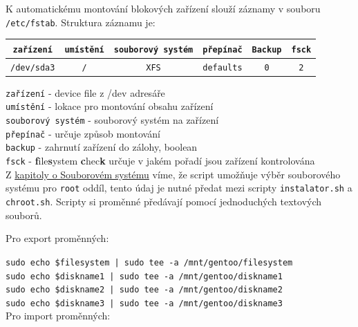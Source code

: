 \documentclass[12pt,a4paper,twoside,]{article}
\begin{document}
{{{{{{K automatickému montování blokových zařízení slouží záznamy v souboru \texttt{/etc/fstab}. Struktura záznamu je:

\begin{table}[h]
	\begin{tabular}{|c|c|c|c|c|c|}
		\hline
		\texttt{zařízení} & \texttt{umístění} & \texttt{souborový systém} & \texttt{přepínač} & \texttt{Backup} & \texttt{fsck} \\
		\hline
		\texttt{/dev/sda3} & \texttt{/} & \texttt{XFS} & \texttt{defaults} & \texttt{0} & \texttt{2} \\
		\hline
		
	\end{tabular}
\end{table}
\hspace*{-1.5em}\texttt{zařízení} - device file z /dev adresáře\\
\texttt{umístění} - lokace pro montování obsahu zařízení \\
\texttt{souborový systém} - souborový systém na zařízení\\
\texttt{přepínač} - určuje způsob montování\\
\texttt{backup} - zahrnutí zařízení do zálohy, boolean\\
\texttt{fsck} - {\bf f}ile{\bf s}ystem {\bf c}hec{\bf k} určuje v jakém pořadí jsou zařízení kontrolována\\

Z \hyperlink{Souborový systém}{kapitoly o Souborovém systému} víme, že script umožňuje výběr souborového systému pro \texttt{root} oddíl, tento údaj je nutné předat mezi scripty \texttt{instalator.sh} a \texttt{chroot.sh}. Scripty si proměnné předávají pomocí jednoduchých textových souborů.

\hspace*{-1.5em}Pro export proměnných:

\texttt{sudo echo \$filesystem | sudo tee -a /mnt/gentoo/filesystem} \\
\hspace*{1.5em}\texttt{sudo echo \$diskname1 | sudo tee -a /mnt/gentoo/diskname1} \\
\hspace*{1.5em}\texttt{sudo echo \$diskname2 | sudo tee -a /mnt/gentoo/diskname2} \\
\hspace*{1.5em}\texttt{sudo echo \$diskname3 | sudo tee -a /mnt/gentoo/diskname3} \\

\hspace*{-1.5em}Pro import proměnných:

}}}}}}
\end{document}
